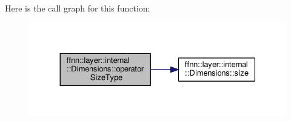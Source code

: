 Here is the call graph for this function\-:
\nopagebreak
\begin{figure}[H]
\begin{center}
\leavevmode
\includegraphics[width=330pt]{structffnn_1_1layer_1_1internal_1_1_dimensions_a9f9e33a5d3c0e148f394364ca61e2b66_cgraph}
\end{center}
\end{figure}



